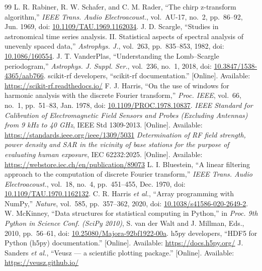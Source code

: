 \documentclass[10pt,letterpaper]{article}
\numberwithin{equation}{section}
\begin{document}
\begin{thebibliography}{99}
 L. R. Rabiner, R. W. Schafer, and C. M. Rader, ``The chirp z-transform algorithm,'' \emph{IEEE Trans. Audio Electroacoust.}, vol.~AU-17, no.~2, pp.~86--92, Jun. 1969, doi: \href{https://doi.org/10.1109/TAU.1969.1162034}{10.1109/TAU.1969.1162034}.
 J. D. Scargle, ``Studies in astronomical time series analysis. II. Statistical aspects of spectral analysis of unevenly spaced data,'' \emph{Astrophys. J.}, vol.~263, pp.~835--853, 1982, doi: \href{https://doi.org/10.1086/160554}{10.1086/160554}.
 J. T. VanderPlas, ``Understanding the Lomb--Scargle periodogram,'' \emph{Astrophys. J. Suppl. Ser.}, vol.~236, no.~1, 2018, doi: \href{https://doi.org/10.3847/1538-4365/aab766}{10.3847/1538-4365/aab766}.
 scikit-rf developers, ``scikit-rf documentation.'' [Online]. Available: \url{https://scikit-rf.readthedocs.io/}
 F. J. Harris, ``On the use of windows for harmonic analysis with the discrete Fourier transform,'' \emph{Proc. IEEE}, vol.~66, no.~1, pp.~51--83, Jan. 1978, doi: \href{https://doi.org/10.1109/PROC.1978.10837}{10.1109/PROC.1978.10837}.
 \emph{IEEE Standard for Calibration of Electromagnetic Field Sensors and Probes (Excluding Antennas) from 9 kHz to 40 GHz}, IEEE Std 1309-2013. [Online]. Available: \url{https://standards.ieee.org/ieee/1309/5031}
 \emph{Determination of RF field strength, power density and SAR in the vicinity of base stations for the purpose of evaluating human exposure}, IEC 62232:2025. [Online]. Available: \url{https://webstore.iec.ch/en/publication/89073}
 L. I. Bluestein, ``A linear filtering approach to the computation of discrete Fourier transform,'' \emph{IEEE Trans. Audio Electroacoust.}, vol.~18, no.~4, pp.~451--455, Dec. 1970, doi: \href{https://doi.org/10.1109/TAU.1970.1162132}{10.1109/TAU.1970.1162132}.
 C. R. Harris \emph{et al.}, ``Array programming with NumPy,'' \emph{Nature}, vol.~585, pp.~357--362, 2020, doi: \href{https://doi.org/10.1038/s41586-020-2649-2}{10.1038/s41586-020-2649-2}.
 W. McKinney, ``Data structures for statistical computing in Python,'' in \emph{Proc. 9th Python in Science Conf. (SciPy 2010)}, S. van der Walt and J. Millman, Eds., 2010, pp.~56--61, doi: \href{https://doi.org/10.25080/Majora-92bf1922-00a}{10.25080/Majora-92bf1922-00a}.
 h5py developers, ``HDF5 for Python (h5py) documentation.'' [Online]. Available: \url{https://docs.h5py.org/}
 J. Sanders \emph{et al.}, ``Veusz --- a scientific plotting package.'' [Online]. Available: \url{https://veusz.github.io/}

\end{thebibliography}
\end{document}
